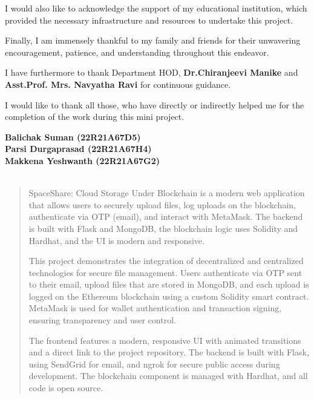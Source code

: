 \documentclass[a4paper, 12pt]{report}
\newenvironment{frontmatter}{}{}
\begin{document}
\begin{frontmatter}
\par I would also like to acknowledge the support of my educational institution, which provided the necessary infrastructure and resources to undertake this project.\\
\par Finally, I am immensely thankful to my family and friends for their unwavering encouragement, patience, and understanding throughout this endeavor.\\
\par I have furthermore to thank Department HOD,  {\bf Dr.Chiranjeevi Manike} and {\bf Asst.Prof. Mrs. Navyatha Ravi} for continuous guidance.\\
\par I would like to thank all those, who have directly or indirectly helped me for the completion of the work during this mini project.
\vspace{0.8in}
\begin{flushright}
\textbf{Balichak Suman (22R21A67D5)}\\[0.1cm]
\textbf{Parsi Durgaprasad (22R21A67H4)}\\[0.1cm]
\textbf{Makkena Yeshwanth (22R21A67G2)}\\[0.1cm]
\hspace*{0.1in}{B.Tech CSE (DS)}\\
\end{flushright}
\setcounter{page}{1}
\newpage
\tableofcontents
\listoffigures
\listoftables

\newpage
\begin{abstract}
SpaceShare: Cloud Storage Under Blockchain is a modern web application that allows users to securely upload files, log uploads on the blockchain, authenticate via OTP (email), and interact with MetaMask. The backend is built with Flask and MongoDB, the blockchain logic uses Solidity and Hardhat, and the UI is modern and responsive.

This project demonstrates the integration of decentralized and centralized technologies for secure file management. Users authenticate via OTP sent to their email, upload files that are stored in MongoDB, and each upload is logged on the Ethereum blockchain using a custom Solidity smart contract. MetaMask is used for wallet authentication and transaction signing, ensuring transparency and user control.

The frontend features a modern, responsive UI with animated transitions and a direct link to the project repository. The backend is built with Flask, using SendGrid for email, and ngrok for secure public access during development. The blockchain component is managed with Hardhat, and all code is open source.


\end{abstract}
\end{frontmatter}
\end{document}
